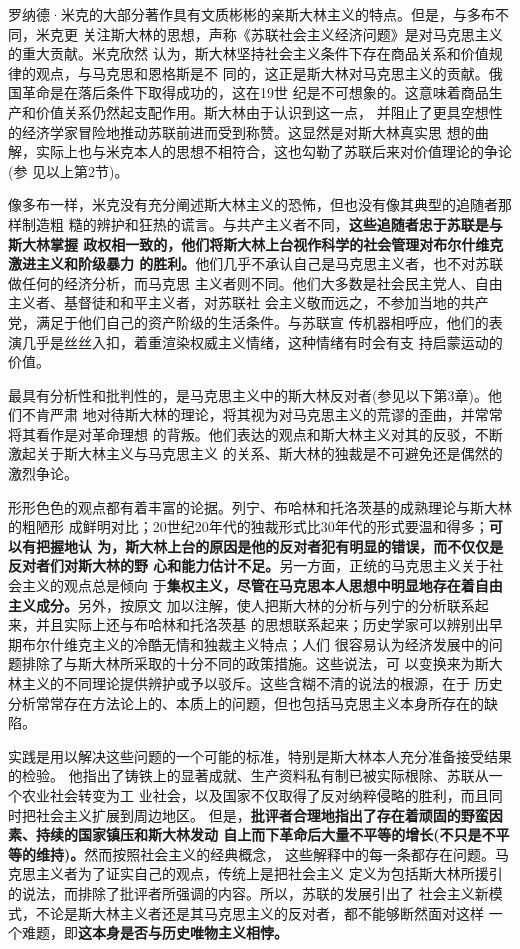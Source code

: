 罗纳德·米克的大部分著作具有文质彬彬的亲斯大林主义的特点。但是，与多布不同，米克更
关注斯大林的思想，声称《苏联社会主义经济问题》是对马克思主义的重大贡献。米克欣然
认为，斯大林坚持社会主义条件下存在商品关系和价值规律的观点，与马克思和恩格斯是不
同的，这正是斯大林对马克思主义的贡献。俄国革命是在落后条件下取得成功的，这在19世
纪是不可想象的。这意味着商品生产和价值关系仍然起支配作用。斯大林由于认识到这一点，
并阻止了更具空想性的经济学家冒险地推动苏联前进而受到称赞。这显然是对斯大林真实思
想的曲解，实际上也与米克本人的思想不相符合，这也勾勒了苏联后来对价值理论的争论(参
见以上第2节)。

像多布一样，米克没有充分阐述斯大林主义的恐怖，但也没有像其典型的追随者那样制造粗
糙的辨护和狂热的谎言。与共产主义者不同，\textbf{这些追随者忠于苏联是与斯大林掌握
  政权相一致的，他们将斯大林上台视作科学的社会管理对布尔什维克激进主义和阶级暴力
  的胜利。}他们几乎不承认自己是马克思主义者，也不对苏联做任何的经济分析，而马克思
主义者则不同。他们大多数是社会民主党人、自由主义者、基督徒和和平主义者，对苏联社
会主义敬而远之，不参加当地的共产党，满足于他们自己的资产阶级的生活条件。与苏联宣
传机器相呼应，他们的表演几乎是丝丝入扣，着重渲染权威主义情绪，这种情绪有时会有支
持启蒙运动的价值。

最具有分析性和批判性的，是马克思主义中的斯大林反对者(参见以下第3章)。他们不肯严肃
地对待斯大林的理论，将其视为对马克思主义的荒谬的歪曲，并常常将其看作是对革命理想
的背叛。他们表达的观点和斯大林主义对其的反驳，不断激起关于斯大林主义与马克思主义
的关系、斯大林的独裁是不可避免还是偶然的激烈争论。

形形色色的观点都有着丰富的论据。列宁、布哈林和托洛茨基的成熟理论与斯大林的粗陋形
成鲜明对比；20世纪20年代的独裁形式比30年代的形式要温和得多；\textbf{可以有把握地认
  为，斯大林上台的原因是他的反对者犯有明显的错误，而不仅仅是反对者们对斯大林的野
  心和能力估计不足。}另一方面，正统的马克思主义关于社会主义的观点总是倾向
于\textbf{集权主义，尽管在马克思本人思想中明显地存在着自由主义成分。}另外，按原文
加以注解，使人把斯大林的分析与列宁的分析联系起来，并且实际上还与布哈林和托洛茨基
的思想联系起来；历史学家可以辨别出早期布尔什维克主义的冷酷无情和独裁主义特点；人们
很容易认为经济发展中的问题排除了与斯大林所采取的十分不同的政策措施。这些说法，可
以变换来为斯大林主义的不同理论提供辨护或予以驳斥。这些含糊不清的说法的根源，在于
历史分析常常存在方法论上的、本质上的问题，但也包括马克思主义本身所存在的缺陷。

实践是用以解决这些问题的一个可能的标准，特别是斯大林本人充分准备接受结果的检验。
他指出了铸铁上的显著成就、生产资料私有制已被实际根除、苏联从一个农业社会转变为工
业社会，以及国家不仅取得了反对纳粹侵略的胜利，而且同时把社会主义扩展到周边地区。
但是，\textbf{批评者合理地指出了存在着顽固的野蛮因素、持续的国家镇压和斯大林发动
  自上而下革命后大量不平等的增长(不只是不平等的维持)。}然而按照社会主义的经典概念，
这些解释中的每一条都存在问题。马克思主义者为了证实自己的观点，传统上是把社会主义
定义为包括斯大林所援引的说法，而排除了批评者所强调的内容。所以，苏联的发展引出了
社会主义新模式，不论是斯大林主义者还是其马克思主义的反对者，都不能够断然面对这样
一个难题，即\textbf{这本身是否与历史唯物主义相悖。}

